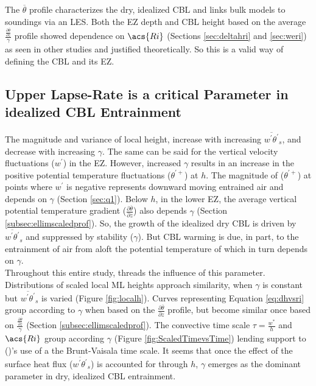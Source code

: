 The $\overline{\theta}$ profile characterizes the dry, idealized \acs{CBL} and links bulk models to soundings via an \acs{LES}.  Both the \acs{EZ} depth and \acs{CBL} height based on the average $\frac{\frac{\partial \overline{\theta}}{\partial z}}{\gamma}$ profile showed dependence on $\acs{Ri}$ (Sections \ref{sec:deltahri} and \ref{sec:weri}) as seen in other studies and justified theoretically.  So this is a valid way of defining the \acs{CBL} and its \acs{EZ}.  

\subsection{Upper Lapse-Rate is a critical Parameter in idealized \acs{CBL} Entrainment}

The magnitude and variance of local height, increase with increasing $\overline{w^{'}\theta^{'}}_{s}$, and decrease with increasing $\gamma$.  The same can be said for the vertical velocity fluctuations ($w^{'}$) in the \acs{EZ}.  However, increased $\gamma$ results in an increase in the positive potential temperature fluctuations ($\theta^{'+}$) at $h$. The magnitude of ($\theta^{'+}$) at points where $w^{'}$ is negative represents downward moving entrained air and depends on $\gamma$ (Section \ref{sec:q1}).  Below $h$, in the lower \acs{EZ}, the average vertical potential temperature gradient ($\frac{\partial \overline{\theta}}{\partial z}$) also depends $\gamma$ (Section \ref{subsec:ellimscaledprof}). So, the growth of the idealized dry \acs{CBL} is driven by $\overline{w^{'}\theta^{'}}_{s}$ and suppressed by stability ($\gamma$). But \acs{CBL} warming is due, in part, to the entrainment of air from aloft the potential temperature of which in turn depends on $\gamma$.\\

Throughout this entire study, threads the influence of this parameter.  Distributions of scaled local \acs{ML} heights approach similarity, when $\gamma$ is constant but $\overline{w^{'}\theta^{'}}_{s}$ is varied (Figure \ref{fig:localh}).  Curves representing Equation \ref{eq:dhvsri} group according to $\gamma$ when based on the $\frac{\partial \overline{\theta}}{\partial z}$ profile, but become similar once based on $\frac{\frac{\partial \overline{\theta}}{\partial z}}{\gamma}$ (Section \ref{subsec:ellimscaledprof}).  The convective time scale $\tau = \frac{w^{*}}{h}$ and $\acs{Ri}$ group according $\gamma$ (Figure \ref{fig:ScaledTimevsTime}) lending support to \citeauthor{FedConzMir04} (\citeyear{FedConzMir04})'s use of a the Brunt-Vaisala time scale.  It seems that once the effect of the surface heat flux ($\overline{w^{'}\theta^{'}}_{s}$) is accounted for through $h$, $\gamma$ emerges as the dominant parameter in dry, idealized \acs{CBL} entrainment.\\ 

